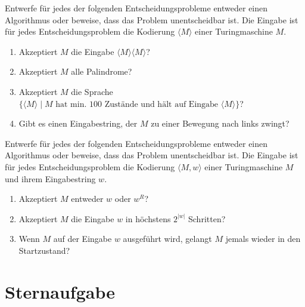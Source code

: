 \documentclass{uebung_cs}
\begin{document}
\begin{aufgabe}
	Entwerfe für jedes der folgenden Entscheidungsprobleme entweder einen Algorithmus oder beweise, dass das Problem unentscheidbar ist. Die Eingabe ist für jedes Entscheidungsproblem die Kodierung $\langle M \rangle$ einer Turingmaschine $M$.
	\begin{enumerate}
		\item Akzeptiert $M$ die Eingabe $\langle M \rangle \langle M \rangle$?
		\item Akzeptiert $M$ alle Palindrome?
		\item Akzeptiert $M$ die Sprache $\{\langle M \rangle \;|\; M \text{ hat min. 100 Zustände und hält auf Eingabe } \langle M \rangle\}$?
		\item Gibt es einen Eingabestring, der $M$ zu einer Bewegung nach links zwingt?
	\end{enumerate}
\end{aufgabe}

\begin{aufgabe}[Entscheidbarkeit IV]
	Entwerfe für jedes der folgenden Entscheidungsprobleme entweder einen Algorithmus oder beweise, dass das Problem unentscheidbar ist. Die Eingabe ist für jedes Entscheidungsproblem die Kodierung $\langle M,w \rangle$ einer Turingmaschine $M$ und ihrem Eingabestring $w$.
	\begin{enumerate}
		\item Akzeptiert $M$ entweder $w$ oder $w^R$?
		\item Akzeptiert $M$ die Eingabe $w$ in höchstens $2^{|w|}$ Schritten?
		\item Wenn $M$ auf der Eingabe $w$ ausgeführt wird, gelangt $M$ jemals wieder in den Startzustand?
	\end{enumerate}
\end{aufgabe}


\section*{Sternaufgabe}
\end{document}
